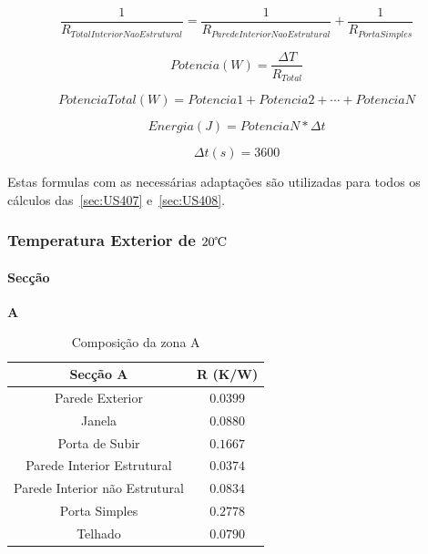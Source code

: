 \documentclass[12pt, a4paper]{article}
\begin{document}
\begin{equation}
	\dfrac{1}{R_{TotalInteriorNaoEstrutural}} =
	\dfrac{1}{R_{Parede Interior Nao Estrutural}} +
	\dfrac{1}{R_{Porta Simples}}
	\label{eq:US407formula3}
\end{equation}



\begin{equation}
	Potencia(W) =
	\dfrac{{\Delta} T}{R_{Total}}
	\label{eq:US407formula4}
\end{equation}

\begin{equation}
	PotenciaTotal(W) =
	Potencia1 +
	Potencia2 + \cdots +
	PotenciaN
	\label{eq:US407formula5}
\end{equation}

\begin{equation}
	Energia(J) = PotenciaN * {\Delta}t
	\label{eq:US407formula7}
\end{equation}

\begin{equation}
	{\Delta}t(s) = 3600
	\label{eq:US407formula6}
\end{equation}

\vspace{13mm}
Estas formulas com as necessárias adaptações são utilizadas para todos os cálculos das~\ref{sec:US407} e~\ref{sec:US408}.


\pagebreak
\subsubsection{Temperatura Exterior de $20\celsius$}
\paragraph{Secção}
\textbf{A}

\begin{table}[htpb]
	\begin{center}
		\begin{tabular}{c c}
			\toprule
			Secção A   													 & 	R (K/W) \\
			\midrule
			Parede Exterior			               				     & $0.0399$		 \\
			Janela                  										 & $0.0880$		 \\
			Porta de Subir              	  							 & $0.1667$		 \\
			\cline{1-1}
			Parede Interior Estrutural             	   		 & $0.0374$		 \\
			\cline{1-1}
			Parede Interior n\~ao Estrutural          		 & $0.0834$		 \\
			Porta Simples                 							 & $0.2778$		 \\
			\cline{1-1}
			Telhado                   									 & $0.0790$		 \\
			\bottomrule
		\end{tabular}
	\end{center}
	\caption{Composição da zona A}\label{tab:seccaoA}
\end{table}
\end{document}
